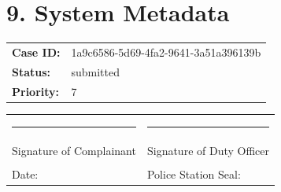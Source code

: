 \documentclass[11pt, a4paper]{article}
\begin{document}
\section{9. System Metadata}
\begin{tabular}{ll}
  \textbf{Case ID:} & 1a9c6586-5d69-4fa2-9641-3a51a396139b \\
  \textbf{Status:} & submitted \\
  \textbf{Priority:} & 7 \\
\end{tabular}

\vspace{1cm}
\noindent
\begin{tabular}{@{}p{}p{}@{}}
  \rule{6cm}{0.4pt} & \rule{6cm}{0.4pt} \\
  Signature of Complainant & Signature of Duty Officer \\
  & \\
  Date: & Police Station Seal: \\
\end{tabular}
\end{document}
